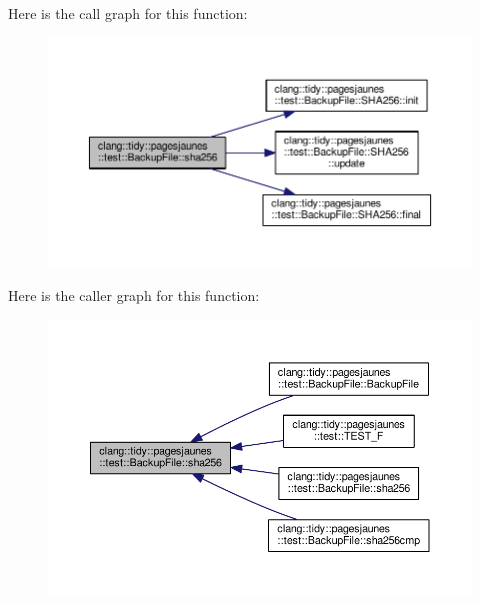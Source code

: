 Here is the call graph for this function\+:
\nopagebreak
\begin{figure}[H]
\begin{center}
\leavevmode
\includegraphics[width=350pt]{classclang_1_1tidy_1_1pagesjaunes_1_1test_1_1_backup_file_a146fa015b7bb79122129c84f4d0ef54f_cgraph}
\end{center}
\end{figure}
Here is the caller graph for this function\+:
\nopagebreak
\begin{figure}[H]
\begin{center}
\leavevmode
\includegraphics[width=350pt]{classclang_1_1tidy_1_1pagesjaunes_1_1test_1_1_backup_file_a146fa015b7bb79122129c84f4d0ef54f_icgraph}
\end{center}
\end{figure}
\mbox{\label{classclang_1_1tidy_1_1pagesjaunes_1_1test_1_1_backup_file_a886904478367718ab3cda84138a64a68}} 
